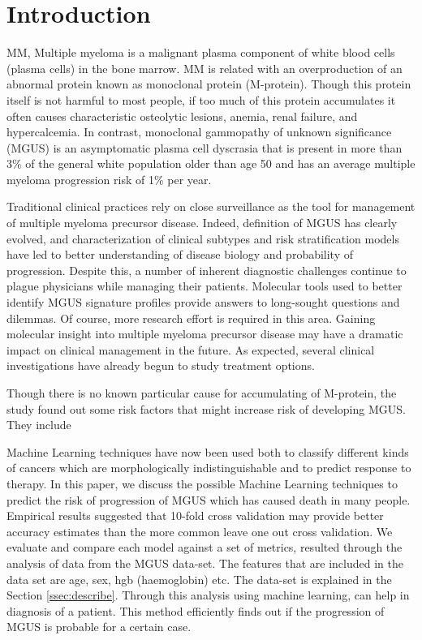 \documentclass[conference]{IEEEtran}
\begin{document}
\section{Introduction}
\par MM, Multiple myeloma is a malignant plasma component of white blood cells (plasma cells) in the bone marrow. MM is related with an overproduction of an abnormal protein known as monoclonal protein (M-protein). Though this protein itself is not harmful to most people, if too much of this protein accumulates it often causes characteristic osteolytic lesions, anemia, renal failure, and hypercalcemia. \cite{monoclonal8} In contrast, monoclonal gammopathy of unknown significance (MGUS) is an asymptomatic plasma cell dyscrasia that is present in more than 3\% of the general white population older than age 50 and has an average multiple myeloma progression risk of 1\% per year. \cite{monoclonal9} \par

Traditional clinical practices rely on close surveillance as the tool for management of multiple myeloma precursor disease. Indeed, definition of MGUS has clearly evolved, and characterization of clinical subtypes and risk stratification models have led to better understanding of disease biology and probability of progression. Despite this, a number of inherent diagnostic challenges continue to plague physicians while managing their patients. Molecular tools used to better identify MGUS signature profiles provide answers to long-sought questions and dilemmas. Of course, more research effort is required in this area. Gaining molecular insight into multiple myeloma precursor disease may have a dramatic impact on clinical management in the future. As expected, several clinical investigations have already begun to study treatment options. \par

Though there is no known particular cause for accumulating of M-protein, the study found out some risk factors that might increase risk of developing MGUS. They include

\par
Machine Learning techniques have now been used both to classify different kinds of cancers which are morphologically indistinguishable and to predict response to therapy. In this paper, we discuss the possible Machine Learning techniques to predict the risk of progression of MGUS which has caused death in many people. Empirical results suggested that 10-fold cross validation may provide better accuracy estimates than the more common leave one out cross validation. We evaluate and compare each model against a set of metrics, resulted through the analysis of data from the MGUS data-set. The features that are included in the data set are age, sex, hgb (haemoglobin) etc. The data-set is explained in the Section \ref{ssec:describe}. Through this analysis using machine learning, can help in diagnosis of a patient. This method efficiently finds out if the progression of MGUS is probable for a certain case.
\end{document}
